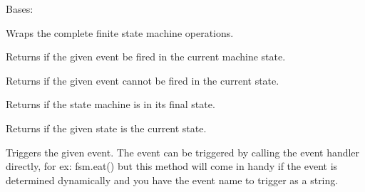 \documentclass[letterpaper,10pt,english]{sphinxmanual}
\begin{document}
\begin{fulllineitems}
\label{enuActor:enuActor.MyFSM.Fysom}
Bases: 

Wraps the complete finite state machine operations.

\begin{fulllineitems}
\label{enuActor:enuActor.MyFSM.Fysom.can}
Returns if the given event be fired in the current machine state.

\end{fulllineitems}


\begin{fulllineitems}
\label{enuActor:enuActor.MyFSM.Fysom.cannot}
Returns if the given event cannot be fired in the current state.

\end{fulllineitems}


\begin{fulllineitems}
\label{enuActor:enuActor.MyFSM.Fysom.is_finished}
Returns if the state machine is in its final state.

\end{fulllineitems}


\begin{fulllineitems}
\label{enuActor:enuActor.MyFSM.Fysom.isstate}
Returns if the given state is the current state.

\end{fulllineitems}


\begin{fulllineitems}
\label{enuActor:enuActor.MyFSM.Fysom.trigger}
Triggers the given event.
The event can be triggered by calling the event handler directly, for ex: fsm.eat()
but this method will come in handy if the event is determined dynamically and you have
the event name to trigger as a string.

\end{fulllineitems}


\end{fulllineitems}
\end{document}
